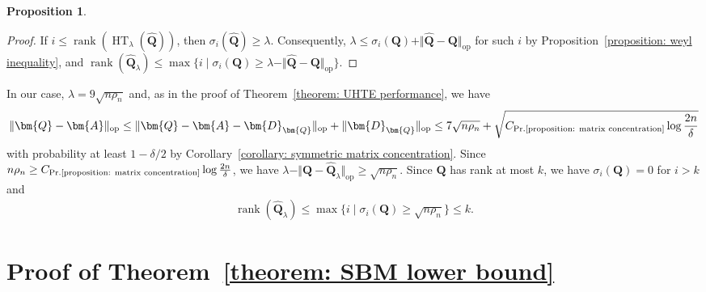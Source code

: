 \documentclass[11pt]{article}
\newcommand{\op}{\mathrm{op}}
\newcommand{\bA}{\bm{A}}
\newcommand{\bQ}{\bm{Q}}
\newcommand{\bD}{\bm{D}}
\newcommand{\constantBandeira}{C_{\text{Pr.\ref{proposition: matrix concentration}}}}
\newcommand{\<}{\langle}
\renewcommand{\>}{\rangle}
\DeclareMathOperator{\rank}{rank}
\theoremstyle{plain}
\newtheorem{prop}{Proposition}
\theoremstyle{definition}
\theoremstyle{remark}
\begin{document}
{\begin{prop}
\end{prop}

\begin{proof}
	If $i \le \rank(\operatorname{HT}_{\lambda}(\widehat{\bQ}))$, then $\sigma_i(\widehat{\bQ}) \ge \lambda$. Consequently, $\lambda \le \sigma_i(\bQ) + \Vert \widehat{\bQ} - \bQ \Vert_{\op} $ for such $i$ by Proposition~\ref{proposition: weyl inequality}, and $\rank(\widehat{\bQ}_\lambda) \le \max \{ i \mid \sigma_i(\bQ) \ge \lambda - \Vert \widehat{\bQ} - \bQ \Vert_{\op} \}$. 
\end{proof}

In our case, $\lambda = 9 \sqrt{n \rho_n}$ and, as in the proof of Theorem~\ref{theorem: UHTE performance}, we have 
\begin{align}
    \Vert \bQ - \bA \Vert_{\op} \le \Vert \bQ - \bA - \bD_{\bQ}\Vert_{\op} + \Vert \bD_{\bQ} \Vert_{\op} \le   7 \sqrt{n \rho_n} + \sqrt{\constantBandeira \log \frac{2n}{\delta}} \label{eq: Bandeira bound for Q minus A}
\end{align}
with probability at least $1 - \delta/2$ by Corollary~\ref{corollary: symmetric matrix concentration}. Since $n \rho_n \ge \constantBandeira \log \frac{2n}{\delta}$, we have $\lambda - \Vert \bQ - \widehat{\bQ}_\lambda \Vert_{\op} \ge  \sqrt{n \rho_n}$. Since $\bQ$ has rank at most $k$, we have $\sigma_i(\bQ) = 0$ for $i > k$ and
\begin{align*}
    \rank(\widehat{\bQ}_\lambda) \le \max \{i \mid \sigma_i(\bQ) \ge \sqrt{n \rho_n}\} \le k.
\end{align*}


\section{Proof of Theorem~\ref{theorem: SBM lower bound}}
\label{appendix: proof of SBM lower bound}

}
\end{document}
